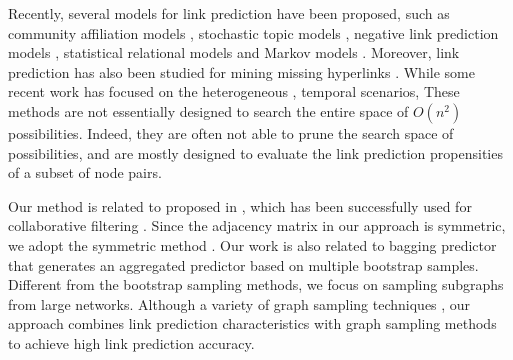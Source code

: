 Recently, several models for link prediction have been proposed,
such as  community affiliation models \cite{Yang09,yang-wsdm2013}, stochastic topic models \cite{barbieri2014},
negative link prediction models \cite{tang2015}, statistical relational models \cite{bilgic,Getoor01,Getoor02,Taskar03,yu}
and Markov models \cite{zhu}. Moreover, link prediction has also been studied for mining
missing hyperlinks \cite{adafre,west2015}.
While some recent work has focused on the heterogeneous \cite{qi,sun11,sun12,tang,yang}, temporal \cite{back,dwang} scenarios, 
These methods are not essentially
designed to search the entire space of $O(n^2)$ possibilities. Indeed, they are often not able to prune the search space of possibilities, and are mostly designed to evaluate the link prediction propensities of a subset of node pairs.

Our method is related to \NMF proposed in \cite{NMF-nature99}, which
has been successfully used for collaborative
filtering \cite{web}. Since the adjacency matrix in our approach is symmetric, we adopt
the symmetric \NMF method \cite{ding}.  Our work is also related
to bagging predictor \cite{Breiman96b-1996} that generates an aggregated
predictor based on multiple bootstrap samples. Different from the bootstrap
sampling methods, we focus on sampling subgraphs from large networks. Although a
variety of graph sampling techniques 
, our approach combines link
prediction characteristics \cite{leskovec-2008} with graph sampling
methods to achieve high link prediction accuracy.







